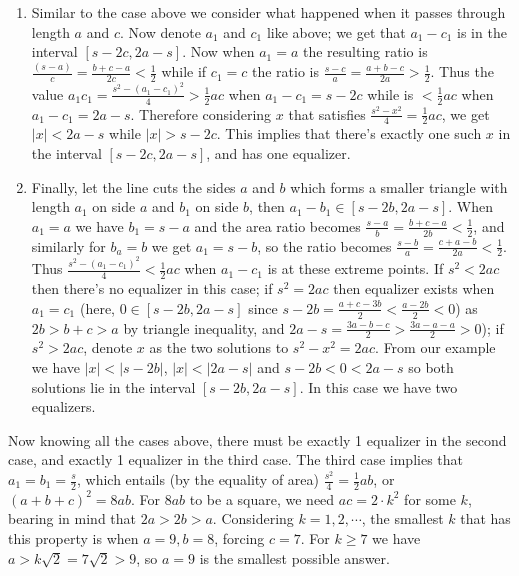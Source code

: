 \documentclass[11pt,a4paper]{article}
\begin{document}
\begin{enumerate}
\begin{enumerate}
	\item Similar to the case above we consider what happened when it passes through length $a$ and $c$. Now denote $a_1$ and $c_1$ like above; we get that $a_1-c_1$ is in the interval $[s-2c, 2a-s]$. Now when $a_1=a$ the resulting ratio is $\frac{(s-a)}{c}=\frac{b+c-a}{2c}<\frac 12$ while if $c_1=c$ the ratio is $\frac{s-c}{a}=\frac{a+b-c}{2a}>\frac 12$. Thus the value $a_1c_1=\frac{s^2-(a_1-c_1)^2}{4}>\frac 12 ac$ when $a_1-c_1=s-2c$ while is $<\frac 12 ac$ when $a_1-c_1=2a-s$. Therefore considering $x$ that satisfies $\frac{s^2-x^2}{4}=\frac 12 ac$, we get $|x|< 2a-s$ while $|x|>s-2c$. This implies that there's exactly one such $x$ in the interval $[s-2c, 2a-s]$, and has one equalizer. 
	
	\item Finally, let the line cuts the sides $a$ and $b$ which forms a smaller triangle with length $a_1$ on side $a$ and $b_1$ on side $b$, then $a_1-b_1\in [s-2b, 2a-s]$. When $a_1=a$ we have $b_1=s-a$ and the area ratio becomes $\frac{s-a}{b}=\frac{b+c-a}{2b}<\frac 12$, and similarly for $b_a=b$ we get $a_1=s-b$, so the ratio becomes $\frac{s-b}{a}=\frac{c+a-b}{2a}<\frac 12$. Thus $\frac{s^2-(a_1-c_1)^2}{4}<\frac 12 ac$ when $a_1-c_1$ is at these extreme points. If $s^2<2ac$ then there's no equalizer in this case; if $s^2=2ac$ then equalizer exists when $a_1=c_1$ (here, $0\in [s-2b, 2a-s]$ since $s-2b=\frac{a+c-3b}{2}<\frac{a-2b}{2}<0$) as $2b>b+c>a$ by triangle inequality, and $2a-s=\frac{3a-b-c}{2}>\frac{3a-a-a}{2}>0$); if $s^2>2ac$, denote $x$ as the two solutions to $s^2-x^2=2ac$. From our example we have $|x|<|s-2b|$, $|x|<|2a-s|$ and $s-2b<0<2a-s$ so both solutions lie in the interval $[s-2b, 2a-s]$. In this case we have two equalizers. 
\end{enumerate}
Now knowing all the cases above, there must be exactly 1 equalizer in the second case, and exactly 1 equalizer in the third case. The third case implies that $a_1=b_1=\frac{s}{2}$, which entails (by the equality of area) $\frac{s^2}{4}=\frac 12 ab$, or $(a+b+c)^2=8ab$. For $8ab$ to be a square, we need $ac=2\cdot k^2$ for some $k$, bearing in mind that $2a>2b>a$. Considering $k=1, 2, \cdots$, the smallest $k$ that has this property is when $a=9, b=8$, forcing $c=7$. For $k\ge 7$ we have $a>k\sqrt{2}=7\sqrt{2}>9$, so $a=9$ is the smallest possible answer. 
\end{enumerate}
\end{document}
